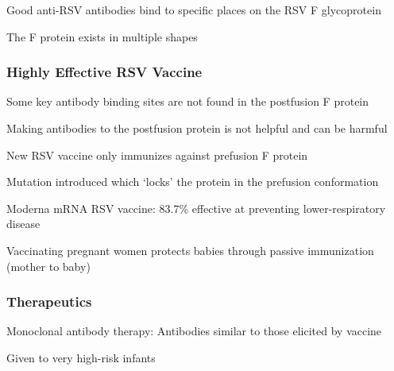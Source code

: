 \documentclass{notes}
\begin{document}
Good anti-RSV antibodies bind to specific places on the RSV F glycoprotein

\tab The F protein exists in multiple shapes

\subsubsection{Highly Effective RSV Vaccine}

Some key antibody binding sites are not found in the postfusion F protein

Making antibodies to the postfusion protein is not helpful and can be harmful 

\tab New RSV vaccine only immunizes against prefusion F protein

\tab Mutation introduced which `locks' the protein in the prefusion conformation

Moderna mRNA RSV vaccine: 83.7\% effective at preventing lower-respiratory disease

\tab Vaccinating pregnant women protects babies through passive immunization (mother to baby)

\subsubsection{Therapeutics}

Monoclonal antibody therapy: Antibodies similar to those elicited by vaccine

\tab Given to very high-risk infants
\end{document}
